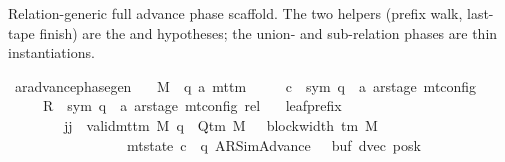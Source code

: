 \begin{isabellebody}
\endisatagproof
{\isafoldproof}%
%
\isadelimproof
%
\endisadelimproof
%
\begin{isamarkuptext}%
Relation-generic full advance phase scaffold.  The two
  helpers (prefix walk, last-tape finish) are the 
  and  hypotheses; the union- and sub-relation
  phases are thin instantiations.%
\end{isamarkuptext}\isamarkuptrue%
\isamarkupfalse%
\ ar{\isacharunderscore}{\kern0pt}advance{\isacharunderscore}{\kern0pt}phase{\isacharunderscore}{\kern0pt}gen{\isacharcolon}{\kern0pt}\isanewline
\ \ \ M\ {\isacharcolon}{\kern0pt}{\isacharcolon}{\kern0pt}\ {\isachardoublequoteopen}{\isacharparenleft}{\kern0pt}{\isacharprime}{\kern0pt}q{\isacharcomma}{\kern0pt}\ {\isacharprime}{\kern0pt}a{\isacharparenright}{\kern0pt}\ mttm{\isachardoublequoteclose}\isanewline
\ \ \ \ \ c{}\ {\isacharcolon}{\kern0pt}{\isacharcolon}{\kern0pt}\ {\isachardoublequoteopen}{\isacharparenleft}{\kern0pt}sym{}{\isacharcomma}{\kern0pt}\ {\isacharprime}{\kern0pt}q\ {\isasymtimes}\ {\isacharprime}{\kern0pt}a\ ar{\isacharunderscore}{\kern0pt}stage{\isacharparenright}{\kern0pt}\ mt{\isacharunderscore}{\kern0pt}config{\isachardoublequoteclose}\isanewline
\ \ \ \ \ R{\isacharprime}{\kern0pt}\ {\isacharcolon}{\kern0pt}{\isacharcolon}{\kern0pt}\ {\isachardoublequoteopen}{\isacharparenleft}{\kern0pt}sym{}{\isacharcomma}{\kern0pt}\ {\isacharprime}{\kern0pt}q\ {\isasymtimes}\ {\isacharprime}{\kern0pt}a\ ar{\isacharunderscore}{\kern0pt}stage{\isacharparenright}{\kern0pt}\ mt{\isacharunderscore}{\kern0pt}config\ rel{\isachardoublequoteclose}\isanewline
\ \ \ leaf{\isacharunderscore}{\kern0pt}prefix{\isacharcolon}{\kern0pt}\isanewline
\ \ \ \ \ \ \ \ {\isachardoublequoteopen}{\isasymAnd}jj{\isachardot}{\kern0pt}\ {\isasymlbrakk}\ valid{\isacharunderscore}{\kern0pt}mttm\ M{\isacharsemicolon}{\kern0pt}\ q\ {\isasymin}\ Q{\isacharunderscore}{\kern0pt}tm\ M{\isacharsemicolon}{\kern0pt}\ {}\ {\isasymle}\ block{\isacharunderscore}{\kern0pt}width\ {\isacharparenleft}{\kern0pt}{\isasymGamma}{\isacharunderscore}{\kern0pt}tm\ M{\isacharparenright}{\kern0pt}{\isacharsemicolon}{\kern0pt}\isanewline
\ \ \ \ \ \ \ \ \ \ \ \ \ \ \ \ \ mt{\isacharunderscore}{\kern0pt}state\ c{}\ {\isacharequal}{\kern0pt}\ {\isacharparenleft}{\kern0pt}q{\isacharcomma}{\kern0pt}\ AR{\isacharunderscore}{\kern0pt}SimAdvance{\isacharcomma}{\kern0pt}\ {}{\isacharcomma}{\kern0pt}\ {}{\isacharcomma}{\kern0pt}\ buf{}{\isacharcomma}{\kern0pt}\ dvec{\isacharcomma}{\kern0pt}\ posk{}{\isacharparenright}{\kern0pt}{\isacharsemicolon}{\kern0pt}\isanewline

\end{isabellebody}
